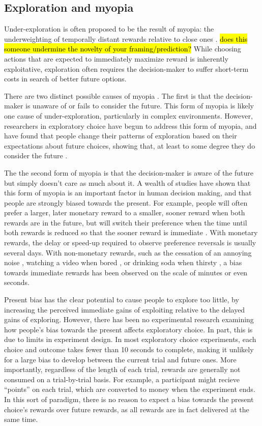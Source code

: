 \documentclass[10pt,letterpaper]{article}
\begin{document}
\subsection{Exploration and myopia}

Under-exploration is often proposed to be the result of myopia: the
underweighting of temporally distant rewards relative to close ones \citep{March1991, Levinthal1993}. 
\hl{does this someone undermine the novelty of your framing/prediction?}
While
choosing actions that are expected to immediately maximize reward is inherently
exploitative, exploration often requires the decision-maker to suffer short-term
costs in search of better future options.

There are two distinct possible causes of myopia \citep{Bartels2015}. The first is that the decision-maker is
unaware of or fails to consider the future. This form of myopia is likely one
cause of under-exploration, particularly in complex environments. However,
researchers in exploratory choice have begun to address this form of myopia, and
have found that people change their
patterns of exploration based on their expectations about future choices,
showing that, at least to some degree they do consider the future \citep{Meyer1995, Wilson2014a, Rich2017}.

The the second form of myopia is that the decision-maker
is aware of the future but simply doesn't care as much about it.
A wealth of studies have shown that this form of myopia is an important factor
in human decision making, and that people are strongly
biased towards  the present. For example, people will often prefer a larger, later monetary
reward to a smaller, sooner reward when both rewards are in the future, but will
switch their preference when the time until both rewards is reduced so that the
sooner reward is immediate \citep{Kirby1995}. With monetary rewards, the delay
or speed-up required to observe preference reversals is usually several days. With non-monetary rewards,
such as the cessation of an annoying noise \citep{Solnick1980}, watching a video
when bored \citep{Navarick1998}, or drinking soda
when thirsty \citep{Brown2009}, a bias towards immediate rewards has been observed on the scale of
minutes or even seconds.

Present bias has the clear potential to cause people to explore too little, by
increasing the perceived immediate gains of exploiting relative to the delayed
gains of exploring. However, there has been no experimental research
examining how people's bias towards the present affects exploratory choice. In
part, this is due to limits in experiment design. In most exploratory
choice experiments, each choice and outcome takes fewer than 10 seconds to
complete, making it unlikely for a large bias to develop between the current
trial and future ones. More importantly, regardless of the length of each trial,
rewards are generally not consumed on a trial-by-trial basis. For example, a participant
might recieve ``points'' on each trial, which are converted to money when the
experiment ends. In this sort of paradigm, there is no reason to expect a bias
towards the present choice's rewards over future rewards, as all rewards are
in fact delivered at the same time.
\end{document}
